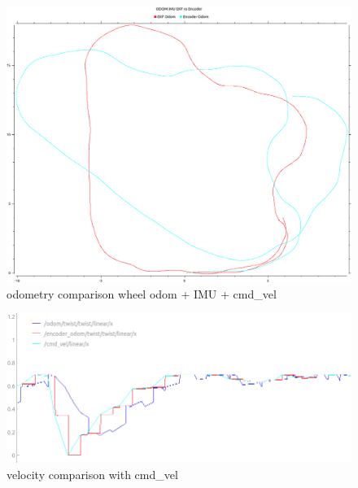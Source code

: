 \begin{figure}[H]
	\includegraphics[width=\textwidth]{Pictures/odom after one round}
	\caption{odometry comparison wheel odom + IMU + cmd\_vel}
	\label{Odometry comparison wheel odomIMUcmdvel}

\end{figure}
\begin{figure}[H]
	\includegraphics[width=\textwidth]{Pictures/circle vel}
	\caption{velocity comparison with cmd\_vel}
	\label{velwithcmd}
\end{figure}



